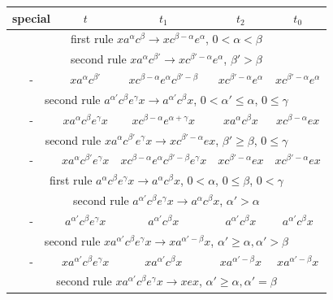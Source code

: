 \documentclass{article}
\theoremstyle{definition}
\begin{document}
\begin{center}
\begin{tabular}{|c|c|c|c|c|}
\hline
special & $t$ & $t_1$ & $t_2$ & $t_0$ \\
\hline
\hline
\multicolumn{5}{|c|}{first rule $x a^\alpha c^\beta \rightarrow x c^{\beta - \alpha} e^\alpha$, $0< \alpha < \beta$}\\
\hline
\hline
\multicolumn{5}{|c|}{second rule $x a^\alpha c^{\beta'} \rightarrow x c^{\beta' -\alpha} e^{\alpha}$, $\beta' > \beta$}\\
\hline
- & $ x a^\alpha c^{\beta'}  $ &  $  x  c^{\beta- \alpha} e^\alpha  c^{\beta'-\beta}  $ &   $   x c^{\beta' -\alpha} e^{\alpha}  $ &  $ x  c^{\beta' -\alpha} e^{\alpha} $ \\
\hline
\multicolumn{5}{|c|}{second rule $a^{\alpha'} c^\beta e^\gamma x  \rightarrow a^{\alpha'} c^\beta x $, $0<\alpha' \le \alpha$, $0 \le \gamma$}\\
\hline
- &  $ x a^\alpha c^{\beta}  e^\gamma x $ &  $  x  c^{\beta - \alpha} e^{\alpha+\gamma}  x $ &   $   x a^{\alpha} c^\beta  x  $ &  $ x  c^{\beta - \alpha} e x $\\
\hline
\multicolumn{5}{|c|}{second rule $ x a^{\alpha} c^{\beta'} e^\gamma x  \rightarrow x  c^{\beta'-\alpha} e  x $, $ \beta' \ge \beta$, $0 \le \gamma$}\\
\hline
- &  $ x a^{\alpha} c^{\beta'} e^\gamma x $ &  $  x  c^{\beta - \alpha} e^{\alpha} c^{\beta' -\beta} e^{\gamma}  x $ &   $   x  c^{\beta'-\alpha} e  x  $ &  $ x   c^{\beta'-\alpha} e x $\\
\hline
\hline
\multicolumn{5}{|c|}{first rule $ a^\alpha c^\beta e^\gamma x  \rightarrow a^\alpha c^\beta x $, $0<\alpha$, $0 \le \beta$, $0 < \gamma$}\\
\hline
\hline
\multicolumn{5}{|c|}{second rule $ a^{\alpha'} c^\beta e^\gamma x  \rightarrow a^\alpha c^\beta x $, $\alpha' > \alpha$}\\
\hline
- &  $  a^{\alpha'} c^\beta e^\gamma x $ &  $  a^{\alpha'} c^\beta   x $ &   $  a^{\alpha'} c^\beta x   $ &  $ a^{\alpha'} c^\beta x  $\\
\hline
\multicolumn{5}{|c|}{second rule $x a^{\alpha'} c^\beta e^\gamma x  \rightarrow x a^{\alpha' -\beta} x $, $\alpha' \ge \alpha, \alpha' > \beta$}\\
\hline
- &  $ x a^{\alpha'} c^\beta e^\gamma x $ &  $  x  a^{\alpha'} c^\beta   x $ &   $  x a^{\alpha' -\beta} x   $ &  $ x a^{\alpha' -\beta} x  $\\
\hline
\multicolumn{5}{|c|}{second rule $x a^{\alpha'} c^\beta e^\gamma x  \rightarrow x e x $, $\alpha' \ge \alpha, \alpha' = \beta$}\\

\end{tabular}
\end{center}
\end{document}
